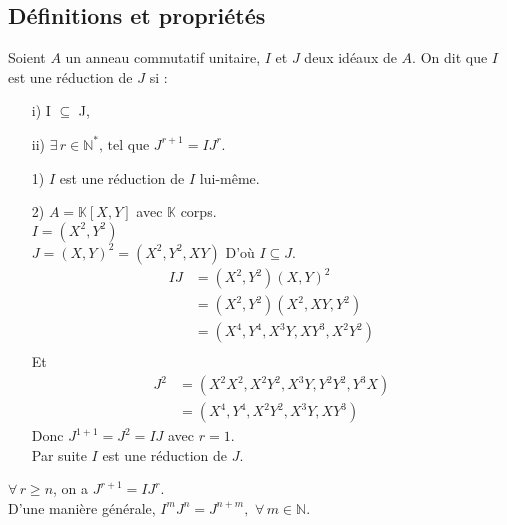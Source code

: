 \subsection{Définitions et propriétés}
\begin{madefinition}
Soient $A$ un anneau commutatif unitaire, $I$ et $J$ deux id\'eaux de $A$.
On dit que $I$ est une réduction de $J$ si :\\
\begin{enumerate}
	\item[i)] I $\subseteq$ J,
	\item[ii)] $\exists \, r\in \mathbb{N}^{*} \text{, tel que } J^{r+1} = IJ^{r}$.
\end{enumerate}
\end{madefinition}
\begin{monexemple}
	\begin{enumerate}
		\item[1)] $I$ est une réduction de $I$ lui-même.
		\item[2)] $A =\mathbb{K}[X,Y]$ avec $\mathbb{K}$ corps.\\
		$I = (X^2, Y^2)$\\
		$J = (X,Y)^2 = (X^2, Y^2, XY) $ D'où $I \subseteq J$.
		\begin{align*}
			IJ&= (X^{2},Y^{2})(X,Y)^{2}\\
			&= (X^{2},Y^{2})(X^{2},XY,Y^{2})\\
			&= (X^{4},Y^{4},X^{3}Y,XY^{3},X^{2}Y^{2})\\
		\end{align*}
		Et \\ 
		\begin{align*}
			J^2 &= (X^2X^2, X^2Y^2, X^3Y, Y^2Y^2, Y^3X)\\
			&= (X^4, Y^4, X^2Y^2, X^3Y, XY^3)
		\end{align*}
		Donc $J^{1+1} = J^2 = IJ $ avec $r=1$.\\
		Par suite $I$ est une réduction de $J$.
	\end{enumerate}
\end{monexemple}
\begin{maremarque}
	$\forall \, r\geq n$, on a $J^{r+1} = IJ^{r}$.\\
	D'une manière générale, $I^{m}J^{n}=J^{n+m}, \, \, \forall \, m\in \mathbb{N}$.	
\end{maremarque}

